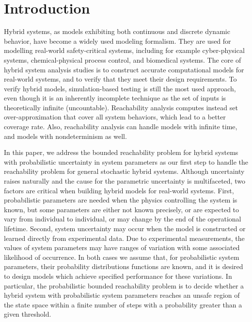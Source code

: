 \section{Introduction}  
Hybrid systems, as models exhibiting both continuous and discrete dynamic behavior, have become 
a widely used modeling formalism. They are used for modelling real-world safety-critical systems,
including for example cyber-physical systems, chemical-physical process control, and biomedical systems. 
The core of hybrid system analysis studies is to construct accurate computational models for real-world systems, 
and to verify that they meet their design requirements. To verify hybrid models, simulation-based testing 
is still the most used approach, even though it is an inherently incomplete technique as the set of inputs
is theoretically infinite (uncountable). Reachability analysis computes instead set over-approximation that
cover all system behaviors, which lead to a better coverage rate. 
Also, reachability analysis can handle models with infinite time, and models with nondeterminism as well. 

In this paper, we address the bounded reachability problem for hybrid systems with probabilistic uncertainty in system parameters as our first step to handle the reachability problem for general stochastic hybrid systems. 
Although uncertainty raises naturally and the cause for the parametric uncertainty is multifaceted, two factors 
are critical when building hybrid models for real-world systems. 
First, probabilistic parameters are needed when the physics controlling the system is known, but some 
parameters are either not known precisely, or are expected to vary from individual to individual, 
or may change by the end of the operational lifetime. 
Second, system uncertainty may occur when the model is constructed or learned directly from experimental data. 
Due to experimental measurements, the values of system parameters may have ranges of variation with some
associated likelihood of occurrence. 
In both cases we assume that, for probabilistic system parameters, their probability distributions functions 
are known, and it is desired to design models which achieve specified performance for these variations.   
In particular, the probabilistic bounded reachability problem is to decide whether
a hybrid system with probabilistic system parameters reaches an unsafe region of the
state space within a finite number of steps with a probability greater than a given threshold.

